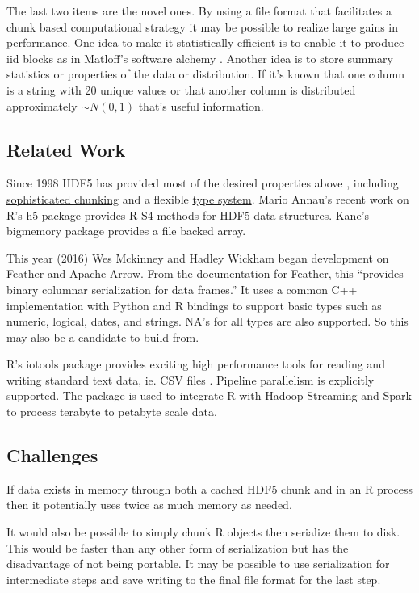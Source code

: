 \documentclass[12pt]{article}
\begin{document}
The last two items are the novel ones. By using a file format
that facilitates a chunk based computational strategy it may be possible to
realize large gains in performance. One idea to make it statistically
efficient is to enable it to produce iid blocks as in Matloff's software
alchemy \cite{matloff2014software}. Another idea is to store summary
statistics or properties of the data or distribution. If it's known that
one column is a string with 20 unique values or that another column is
distributed approximately $\sim N(0, 1)$ that's useful information. 

\subsection{Related Work}

Since 1998 HDF5 has provided most of the desired properties above
\cite{hdf5}, including
\href{https://support.hdfgroup.org/HDF5/doc/Advanced/Chunking/}{sophisticated
chunking} and a flexible
\href{https://support.hdfgroup.org/HDF5/doc1.6/UG/11_Datatypes.html}{type system}.
Mario Annau's recent work on R's \href{https://github.com/mannau/h5}{h5
package} provides R S4 methods for HDF5 data structures. Kane's bigmemory
package provides a file backed array.

This year (2016) Wes Mckinney and Hadley Wickham began development on Feather and
Apache Arrow. From the documentation for Feather, this ``provides binary columnar
serialization for data frames.'' It uses a common C++ implementation with
Python and R bindings to support basic types such as numeric, logical,
dates, and strings. NA's for all types are also supported. So this may also
be a candidate to build from.

R's iotools package provides exciting high performance tools for reading
and writing standard text data, ie. CSV files \cite{arnold2015iotools}.
Pipeline parallelism is explicitly supported. The package is used to
integrate R with Hadoop Streaming and Spark to process terabyte to petabyte
scale data.


\subsection{Challenges}

If data exists in memory through both a cached HDF5 chunk and in an R process
then it potentially uses twice as much memory as needed.

It would also be possible to simply chunk R objects then serialize 
them to disk. This would be faster than any other form of serialization but
has the disadvantage of not being portable. It may be possible to use 
serialization for intermediate steps and save writing to the final file
format for the last step.
\end{document}
